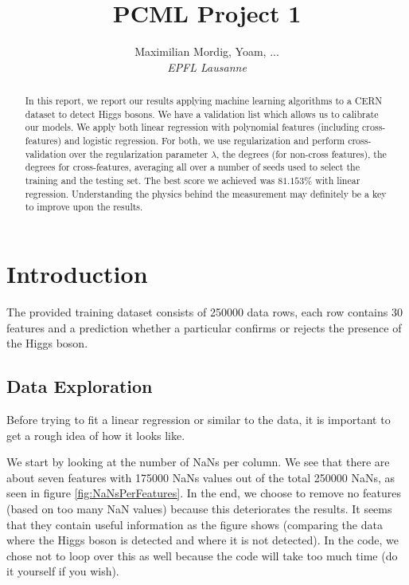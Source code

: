 \documentclass[10pt,conference,compsocconf]{IEEEtran}
\begin{document}
\title{PCML Project 1}

\author{
  Maximilian Mordig, Yoam, ...\\
  \textit{EPFL Lausanne}
}

\maketitle

\begin{abstract}
  In this report, we report our results applying machine learning algorithms to a CERN dataset to detect Higgs bosons. We have a validation list which allows us to calibrate our models. We apply both linear regression with polynomial features (including cross-features) and logistic regression. For both, we use regularization and perform cross-validation over the regularization parameter $\lambda$, the degrees (for non-cross features), the degrees for cross-features, averaging all over a number of seeds used to select the training and the testing set. The best score we achieved was $81.153\%$ with linear regression. Understanding the physics behind the measurement may definitely be a key to improve upon the results.
\end{abstract}

\section{Introduction}

The provided training dataset consists of 250000 data rows, each row contains 30 features and a prediction whether a particular confirms or rejects the presence of the Higgs boson.

\subsection{Data Exploration}
Before trying to fit a linear regression or similar to the data, it is important to get a rough idea of how it looks like. 

We start by looking at the number of NaNs per column. We see that there are about seven features with 175000 NaNs values out of the total 250000 NaNs, as seen in figure \ref{fig:NaNsPerFeatures}. In the end, we choose to remove no features (based on too many NaN values) because this deteriorates the results. It seems that they contain useful information as the figure shows (comparing the data where the Higgs boson is detected and where it is not detected). In the code, we chose not to loop over this as well because the code will take too much time (do it yourself if you wish).
\end{document}
